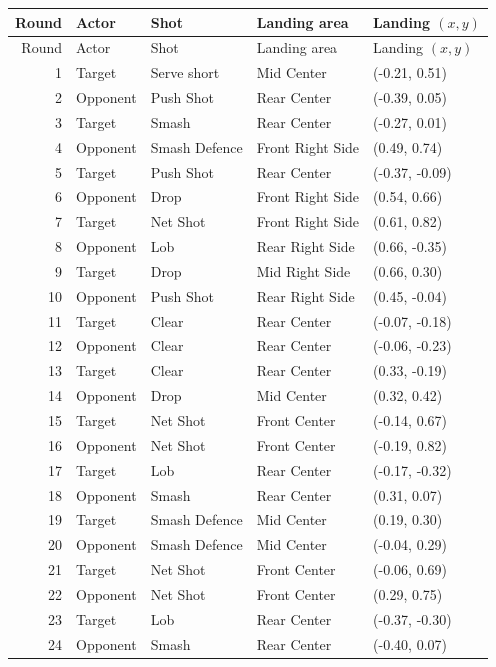 \begin{longtable}{rlllp{2.1cm}}
\toprule
Round & Actor & Shot & Landing area & Landing $(x,y)$ \\
\midrule
\endfirsthead
\toprule
Round & Actor & Shot & Landing area & Landing $(x,y)$ \\
\midrule
\endhead
1 & Target & Serve short & Mid Center & (-0.21, 0.51) \\
2 & Opponent & Push Shot & Rear Center & (-0.39, 0.05) \\
3 & Target & Smash & Rear Center & (-0.27, 0.01) \\
4 & Opponent & Smash Defence & Front Right Side & (0.49, 0.74) \\
5 & Target & Push Shot & Rear Center & (-0.37, -0.09) \\
6 & Opponent & Drop & Front Right Side & (0.54, 0.66) \\
7 & Target & Net Shot & Front Right Side & (0.61, 0.82) \\
8 & Opponent & Lob & Rear Right Side & (0.66, -0.35) \\
9 & Target & Drop & Mid Right Side & (0.66, 0.30) \\
10 & Opponent & Push Shot & Rear Right Side & (0.45, -0.04) \\
11 & Target & Clear & Rear Center & (-0.07, -0.18) \\
12 & Opponent & Clear & Rear Center & (-0.06, -0.23) \\
13 & Target & Clear & Rear Center & (0.33, -0.19) \\
14 & Opponent & Drop & Mid Center & (0.32, 0.42) \\
15 & Target & Net Shot & Front Center & (-0.14, 0.67) \\
16 & Opponent & Net Shot & Front Center & (-0.19, 0.82) \\
17 & Target & Lob & Rear Center & (-0.17, -0.32) \\
18 & Opponent & Smash & Rear Center & (0.31, 0.07) \\
19 & Target & Smash Defence & Mid Center & (0.19, 0.30) \\
20 & Opponent & Smash Defence & Mid Center & (-0.04, 0.29) \\
21 & Target & Net Shot & Front Center & (-0.06, 0.69) \\
22 & Opponent & Net Shot & Front Center & (0.29, 0.75) \\
23 & Target & Lob & Rear Center & (-0.37, -0.30) \\
24 & Opponent & Smash & Rear Center & (-0.40, 0.07) \\
\bottomrule
\end{longtable}

